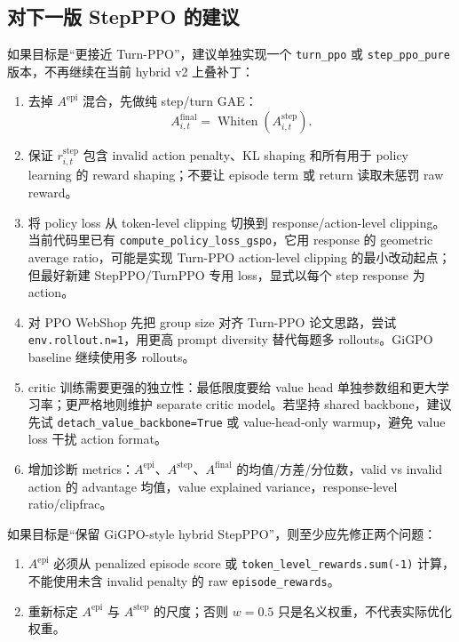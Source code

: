 \documentclass[10pt]{ctexart}
\newcommand{\code}[1]{\texttt{#1}}
\begin{document}
\subsection*{对下一版 StepPPO 的建议}
如果目标是“更接近 Turn-PPO”，建议单独实现一个 \code{turn\_ppo} 或 \code{step\_ppo\_pure} 版本，不再继续在当前 hybrid v2 上叠补丁：
\begin{enumerate}
  \item 去掉 $A^{\mathrm{epi}}$ 混合，先做纯 step/turn GAE：
  \[
  A^{\mathrm{final}}_{i,t}=\operatorname{Whiten}(A^{\mathrm{step}}_{i,t}).
  \]
  \item 保证 $r^{\mathrm{step}}_{i,t}$ 包含 invalid action penalty、KL shaping 和所有用于 policy learning 的 reward shaping；不要让 episode term 或 return 读取未惩罚 raw reward。
  \item 将 policy loss 从 token-level clipping 切换到 response/action-level clipping。当前代码里已有 \code{compute\_policy\_loss\_gspo}，它用 response 的 geometric average ratio，可能是实现 Turn-PPO action-level clipping 的最小改动起点；但最好新建 StepPPO/TurnPPO 专用 loss，显式以每个 step response 为 action。
  \item 对 PPO WebShop 先把 group size 对齐 Turn-PPO 论文思路，尝试 \code{env.rollout.n=1}，用更高 prompt diversity 替代每题多 rollouts。GiGPO baseline 继续使用多 rollouts。
  \item critic 训练需要更强的独立性：最低限度要给 value head 单独参数组和更大学习率；更严格地则维护 separate critic model。若坚持 shared backbone，建议先试 \code{detach\_value\_backbone=True} 或 value-head-only warmup，避免 value loss 干扰 action format。
  \item 增加诊断 metrics：$A^{\mathrm{epi}}$、$A^{\mathrm{step}}$、$A^{\mathrm{final}}$ 的均值/方差/分位数，valid vs invalid action 的 advantage 均值，value explained variance，response-level ratio/clipfrac。
\end{enumerate}

如果目标是“保留 GiGPO-style hybrid StepPPO”，则至少应先修正两个问题：
\begin{enumerate}
  \item $A^{\mathrm{epi}}$ 必须从 penalized episode score 或 \code{token\_level\_rewards.sum(-1)} 计算，不能使用未含 invalid penalty 的 raw \code{episode\_rewards}。
  \item 重新标定 $A^{\mathrm{epi}}$ 与 $A^{\mathrm{step}}$ 的尺度；否则 $w=0.5$ 只是名义权重，不代表实际优化权重。
\end{enumerate}
\end{document}
